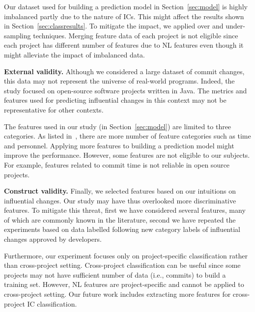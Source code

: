 Our dataset used for building a prediction model in Section~\ref{sec:model} is highly imbalanced partly due to 
the nature of ICs. This might affect the results shown in Section~\ref{sec:classresults}. 
To mitigate the impact, we applied over and under-sampling techniques.%
Merging feature data of each project is not eligible since each project has different number of features 
due to NL features even though it might alleviate the impact of imbalanced data.



\textbf{External validity.} Although we considered a large dataset of commit
changes, this data may not represent the universe of real-world programs.
Indeed, the study focused on open-source software projects written in Java.
The metrics and features used for predicting influential changes in this context
may not be representative for other contexts.

The features used in our study (in Section~\ref{sec:model})
are limited to three categories. As listed in~\cite{shihab_industrial_2012}, there are more number of feature categories such as time and personnel. Applying more features to building a prediction model might improve the performance. However, some features are not eligible to our subjects. 
For example, features related to commit time is not reliable in open source projects.


\textbf{Construct validity.} Finally, we selected features based on
our intuitions on influential changes. Our study may have thus overlooked more
discriminative features. To mitigate this threat, first we have considered several
features, many of which are commonly known in the literature, second we have repeated
the experiments based on data labelled following  new category labels of influential changes
approved by developers. 

Furthermore, our experiment focuses only on project-specific classification rather than cross-project setting. Cross-project classification can be useful since some projects may not have sufficient number of data (i.e., commits) to build a training set. However, NL features are project-specific and cannot be
applied to cross-project setting. 
Our future work includes extracting more features for cross-project IC classification.
